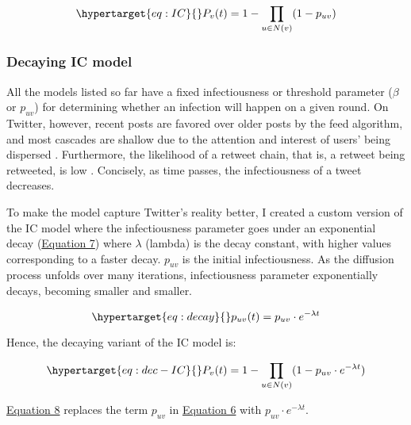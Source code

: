 \documentclass[11pt,a4paper]{article}
\begin{document}
        \begin{equation}
            \hypertarget{eq:IC}{}
            P_v(t) = 1 - \prod_{u \in N(v)} (1 - p_{uv})
        \end{equation}

        \subsubsection{Decaying IC model}
        All the models listed so far have a fixed infectiousness or threshold parameter ($\beta$ or $p_{uv}$) for determining whether an infection will happen on a given round. On Twitter, however, recent posts are favored over older posts by the feed algorithm, and most cascades are shallow due to the attention and interest of users' being dispersed \cite{lorenz-spreen_accelerating_2019, twitter_inc_twitters_2023}. Furthermore, the likelihood of a retweet chain, that is, a retweet being retweeted, is low \cite{goel_note_2015}. Concisely, as time passes, the infectiousness of a tweet decreases.
        
        To make the model capture Twitter's reality better, I created a custom version of the IC model where the infectiousness parameter goes under an exponential decay (\hyperlink{eq:decay}{Equation 7}) where $\lambda$ (lambda) is the decay constant, with higher values corresponding to a faster decay. $p_{uv}$ is the initial infectiousness. As the diffusion process unfolds over many iterations, infectiousness parameter exponentially decays, becoming smaller and smaller.
        
        \begin{equation}
            \hypertarget{eq:decay}{}
            p_{uv}(t) = p_{uv} \cdot e^{-\lambda t}
        \end{equation}

        Hence, the decaying variant of the IC model is:

        \begin{equation}
            \hypertarget{eq:dec-IC}{}
            P_v(t) = 1 - \prod_{u \in N(v)} (1 - p_{uv} \cdot e^{-\lambda t})
        \end{equation}

        \hyperlink{eq:dec-IC}{Equation 8} replaces the term $p_{uv}$ in \hyperlink{eq:IC}{Equation 6} with $p_{uv} \cdot e^{-\lambda t}$.
\end{document}
